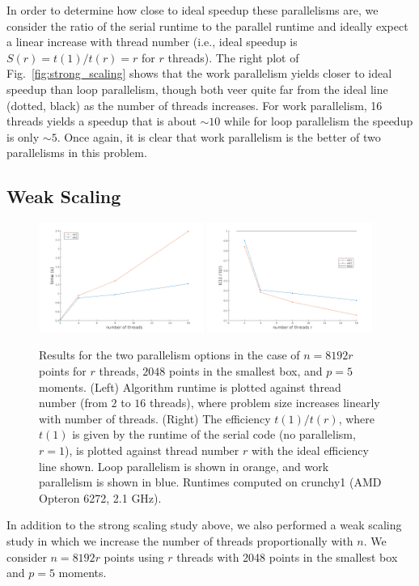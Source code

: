 \documentclass{article}
\begin{document}
In order to determine how close to ideal speedup these parallelisms are, we consider the ratio of the serial runtime to the parallel runtime and ideally expect a linear increase with thread number (i.e., ideal speedup is $S(r) = t(1)/t(r) = r$ for $r$ threads). The right plot of Fig.~\ref{fig:strong_scaling} shows that the work parallelism yields closer to ideal speedup than loop parallelism, though both veer quite far from the ideal line (dotted, black) as the number of threads increases. For work parallelism, 16 threads yields a speedup that is about $\sim 10$ while for loop parallelism the speedup is only $\sim 5$. Once again, it is clear that work parallelism is the better of two parallelisms in this problem.

\subsection{Weak Scaling}
\begin{figure}
  \centering
  \includegraphics[width=0.48\textwidth]{./figures/weak_scalability.png} %
  \includegraphics[width=0.48\textwidth]{./figures/weak_scalability2.png}
  \caption{Results for the two parallelism options in the case of $n=8192r$ points for $r$ threads, $2048$ points in the smallest box, and $p=5$ moments. (Left) Algorithm runtime is plotted against thread number (from $2$ to $16$ threads), where problem size increases linearly with number of threads. (Right) The efficiency $t(1)/t(r)$, where $t(1)$ is given by the runtime of the serial code (no parallelism, $r=1$), is plotted against thread number $r$ with the ideal efficiency line shown. Loop parallelism is shown in orange, and work parallelism is shown in blue. Runtimes computed on crunchy1 (AMD Opteron 6272, 2.1 GHz).}
  \label{fig:weak_scaling}
\end{figure}
In addition to the strong scaling study above, we also performed a weak scaling study in which we increase the number of threads proportionally with $n$. We consider $n=8192r$ points using $r$ threads with 2048 points in the smallest box and $p=5$ moments.
\end{document}
